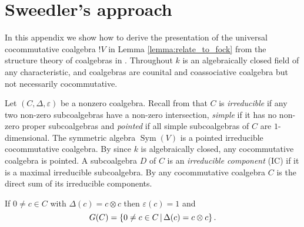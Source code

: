 \documentclass[english,letter paper,12pt,reqno]{article}
\theoremstyle{example}
\numberwithin{equation}{section}
\DeclareMathOperator{\Sym}{Sym}
\begin{document}
\section{Sweedler's approach}\label{section:compare_sweedler}

In this appendix we show how to derive the presentation of the universal cocommutative coalgebra ${!} V$ in Lemma \ref{lemma:relate_to_fock} from the structure theory of coalgebras in \cite{sweedler}. Throughout $k$ is an algebraically closed field of any characteristic, and coalgebras are counital and coassociative coalgebra but not necessarily cocommutative.

Let $(C, \Delta, \varepsilon)$ be a nonzero coalgebra. Recall from \cite[Chapter 8]{sweedler} that $C$ is \emph{irreducible} if any two non-zero subcoalgebras have a non-zero intersection, \emph{simple} if it has no non-zero proper subcoalgebras and \emph{pointed} if all simple subcoalgebras of $C$ are $1$-dimensional. The symmetric algebra $\Sym(V)$ is a pointed irreducible cocommutative coalgebra. By \cite[Lemma 8.0.1]{sweedler} since $k$ is algebraically closed, any cocommutative coalgebra is pointed. A subcoalgebra $D$ of $C$ is an \emph{irreducible component} (IC) if it is a maximal irreducible subcoalgebra. By \cite[Theorem 8.0.5]{sweedler} any cocommutative coalgebra $C$ is the direct sum of its irreducible components.

If $0 \neq c \in C$ with $\Delta(c) = c \otimes c$ then $\varepsilon(c) = 1$ and
\[
G(C) = \{ 0 \neq c \in C \,|\, \Delta(c) = c \otimes c \}\,.
\]
\end{document}
